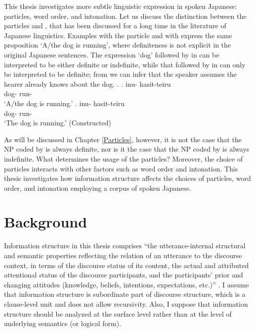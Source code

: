 This thesis investigates more subtle linguistic expression in spoken Japanese:
particles, word order, and intonation.
Let us discuss
the distinction between the particles  and ,
that has been discussed for a long time in the literature of Japanese linguistics.
Examples \Next[a] with the particle  and \Next[b] with 
express the same proposition `A/the dog is running',
where definiteness is not explicit in the original Japanese sentences.
The expression  `dog' followed by  in \Next[a]
can be interpreted to be either definite or indefinite,
while that followed by  in \Next[b]
can only be interpreted to be definite;
from \Next[b] we can infer that the speaker assumes the hearer already knows about the dog.
%
\ex.
 \ag. inu- hasit-teiru \\
      dog- run- \\
      `A/the dog is running.'
 \bg. inu- hasit-teiru \\
      dog- run- \\
      `The dog is running.'
 \hfill{(Constructed)}

As will be discussed in Chapter \ref{Particles},
however,
it is not the case that
the NP coded by  is always definite,
nor is it the case that
the NP coded by  is always indefinite.
What determines the usage of the particles?
Moreover,
the choice of particles interacts with other factors such as
word order and intonation.
This thesis investigates how information structure affects
the choices of particles, word order, and intonation
employing a corpus of spoken Japanese.

\section{Background}\label{IntroBackground}

Information structure in this thesis comprises
``the utterance-internal structural and semantic properties reflecting the relation of an utterance to the discourse context,
in terms of the discourse status of its content,
the actual and attributed attentional status of the discourse participants,
and the participants' prior and changing attitudes
(knowledge, beliefs, intentions, expectations, etc.)''
\cite[250]{kruijff-korbayovasteedman03}.
I assume that
information structure is subordinate part of discourse structure,
which is a clause-level unit and does not allow recursivity.
Also, I suppose that information structure should be analyzed at the surface level rather than at the level of underlying semantics (or logical form).

